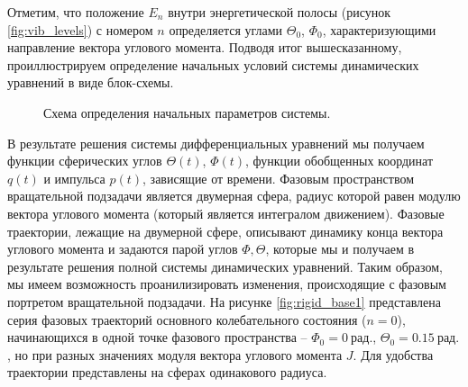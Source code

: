 Отметим, что положение $E_n$ внутри энергетической полосы (рисунок \eqref{fig:vib_levels}) с номером $n$ определяется углами $\Theta_0$, $\Phi_0$, характеризующими направление вектора углового момента. Подводя итог вышесказанному, проиллюстрируем определение начальных условий системы динамических уравнений в виде блок-схемы.

\vverh
\begin{figure}[H]
  \begin{center}
    \caption{Схема определения начальных параметров системы.}
  \end{center}
\end{figure}

В результате решения системы дифференциальных уравнений мы получаем функции сферических углов $\Theta(t)$, $\Phi(t)$, функции обобщенных координат $q(t)$ и импульса $p(t)$, зависящие от времени. Фазовым пространством вращательной подзадачи является двумерная сфера, радиус которой равен модулю вектора углового момента (который является интегралом движением). Фазовые траектории, лежащие на двумерной сфере, описывают динамику конца вектора углового момента и задаются парой углов $\Phi, \Theta$, которые мы и получаем в результате решения полной системы динамических уравнений. Таким образом, мы имеем возможность проанилизировать изменения, происходящие с фазовым портретом вращательной подзадачи. На рисунке \eqref{fig:rigid_base1} представлена серия фазовых траекторий основного колебательного состояния ($n = 0$), начинающихся в одной точке фазового пространства  -- $\Phi_0 = 0 \ \textit{рад.}$, $\Theta_0 = 0.15 \ \textit{рад.}$, но при разных значениях модуля вектора углового момента $J$. Для удобства траектории представлены на сферах одинакового радиуса.

